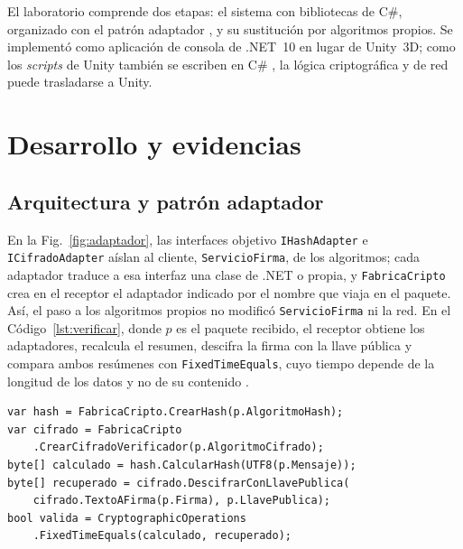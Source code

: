 \documentclass[conference]{IEEEtran}
\begin{document}
El laboratorio comprende dos etapas: el sistema con bibliotecas de C\#, organizado con el patrón adaptador \cite{gof}, y su sustitución por algoritmos propios. Se implementó como aplicación de consola de .NET~10 en lugar de Unity~3D; como los \textit{scripts} de Unity también se escriben en C\# \cite{unity}, la lógica criptográfica y de red puede trasladarse a Unity.

\section{Desarrollo y evidencias}
\label{sec:desarrollo}

\subsection{Arquitectura y patrón adaptador}

En la Fig.~\ref{fig:adaptador}, las interfaces objetivo \texttt{IHashAdapter} e \texttt{ICifradoAdapter} aíslan al cliente, \texttt{ServicioFirma}, de los algoritmos; cada adaptador traduce a esa interfaz una clase de .NET o propia, y \texttt{FabricaCripto} crea en el receptor el adaptador indicado por el nombre que viaja en el paquete. Así, el paso a los algoritmos propios no modificó \texttt{ServicioFirma} ni la red. En el Código~\ref{lst:verificar}, donde $p$ es el paquete recibido, el receptor obtiene los adaptadores, recalcula el resumen, descifra la firma con la llave pública y compara ambos resúmenes con \texttt{FixedTimeEquals}, cuyo tiempo depende de la longitud de los datos y no de su contenido \cite{msFixed}.

\begin{lstlisting}[style=csharp, caption={Verificación en ServicioFirma (simplificada).}, label={lst:verificar}]
var hash = FabricaCripto.CrearHash(p.AlgoritmoHash);
var cifrado = FabricaCripto
    .CrearCifradoVerificador(p.AlgoritmoCifrado);
byte[] calculado = hash.CalcularHash(UTF8(p.Mensaje));
byte[] recuperado = cifrado.DescifrarConLlavePublica(
    cifrado.TextoAFirma(p.Firma), p.LlavePublica);
bool valida = CryptographicOperations
    .FixedTimeEquals(calculado, recuperado);
\end{lstlisting}
\end{document}
